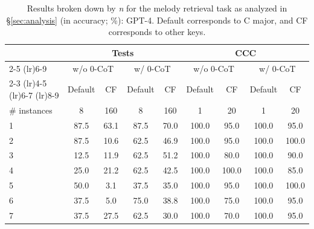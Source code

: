 \begin{table}[t!]
    \centering
    \begin{tabular}{lcccccccc}
        \toprule
        & \multicolumn{4}{c}{Tests} & \multicolumn{4}{c}{CCC} \\
        \cmidrule(lr){2-5}
        \cmidrule(lr){6-9}
        & \multicolumn{2}{c}{w/o 0-CoT} & \multicolumn{2}{c}{w/ 0-CoT} & \multicolumn{2}{c}{w/o 0-CoT} & \multicolumn{2}{c}{w/ 0-CoT} \\
        \cmidrule(lr){2-3}
        \cmidrule(lr){4-5}
        \cmidrule(lr){6-7}
        \cmidrule(lr){8-9} 
        & Default & CF & Default & CF & Default & CF & Default & CF \\
        \midrule
        \# instances & 8 & 160 & 8 & 160 & 1 & 20 & 1 & 20 \\
        \midrule
        1 & 87.5 & 63.1 & 87.5 & 70.0 & 100.0 & \phantom{0}95.0 & 100.0 & \phantom{0}95.0\\
        2 & 87.5 & 10.6 & 62.5 & 46.9 & 100.0 & \phantom{0}95.0 & 100.0 & 100.0\\
        3 & 12.5 & 11.9 & 62.5 & 51.2 & 100.0 & \phantom{0}80.0 & 100.0 & \phantom{0}90.0\\
        4 & 25.0 & 21.2 & 62.5 & 42.5 & 100.0 & 100.0 & 100.0 & \phantom{0}85.0\\
        5 & 50.0 & \phantom{0}3.1 & 37.5 & 35.0 & 100.0 & \phantom{0}95.0 & 100.0 & 100.0\\
        6 & 37.5 & 5.0 & 75.0 & 38.8 & 100.0 & \phantom{0}75.0 & 100.0 & \phantom{0}95.0\\
        7 & 37.5 & 27.5 & 62.5 & 30.0 & 100.0 & \phantom{0}70.0 & 100.0 & \phantom{0}95.0\\
        \bottomrule
    \end{tabular}
    \caption{
    Results broken down by \emph{n} for the melody retrieval task as analyzed in \S\ref{sec:analysis} (in accuracy; \%): GPT-4. Default corresponds to C major, and CF corresponds to other keys.}
\end{table}
